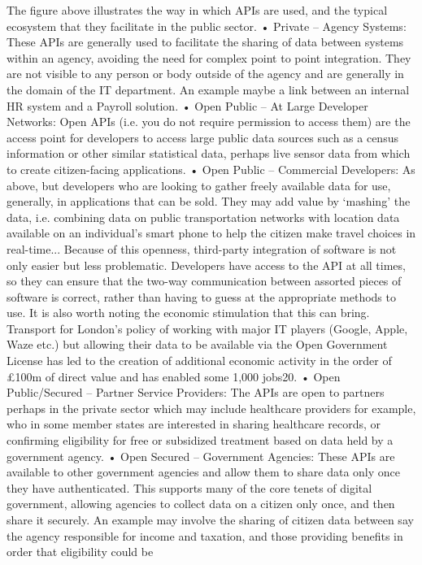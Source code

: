 The figure above illustrates the way in which APIs are used, and the typical ecosystem that they facilitate in
the public sector.
• Private – Agency Systems: These APIs are generally used to facilitate the sharing of data between
systems within an agency, avoiding the need for complex point to point integration. They are not
visible to any person or body outside of the agency and are generally in the domain of the IT
department. An example maybe a link between an internal HR system and a Payroll solution.
• Open Public – At Large Developer Networks: Open APIs (i.e. you do not require permission to
access them) are the access point for developers to access large public data sources such as a
census information or other similar statistical data, perhaps live sensor data from which to create
citizen-facing applications.
• Open Public – Commercial Developers: As above, but developers who are looking to gather freely
available data for use, generally, in applications that can be sold. They may add value by ‘mashing’ 
the data, i.e. combining data on public transportation networks with location data available on an
individual’s smart phone to help the citizen make travel choices in real-time... Because of this
openness, third-party integration of software is not only easier but less problematic. Developers
have access to the API at all times, so they can ensure that the two-way communication between
assorted pieces of software is correct, rather than having to guess at the appropriate methods to
use.
It is also worth noting the economic stimulation that this can bring. Transport for London’s policy of
working with major IT players (Google, Apple, Waze etc.) but allowing their data to be available via
the Open Government License has led to the creation of additional economic activity in the order of
£100m of direct value and has enabled some 1,000 jobs20.
• Open Public/Secured – Partner Service Providers: The APIs are open to partners perhaps in the
private sector which may include healthcare providers for example, who in some member states
are interested in sharing healthcare records, or confirming eligibility for free or subsidized treatment
based on data held by a government agency.
• Open Secured – Government Agencies: These APIs are available to other government agencies
and allow them to share data only once they have authenticated. This supports many of the core
tenets of digital government, allowing agencies to collect data on a citizen only once, and then
share it securely. An example may involve the sharing of citizen data between say the agency
responsible for income and taxation, and those providing benefits in order that eligibility could be
